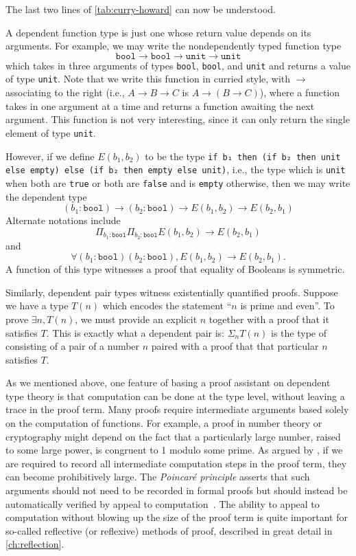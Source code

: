 The last two lines of \autoref{tab:curry-howard} can now be understood.

A dependent function type is just one whose return value depends on its arguments.
For example, we may write the nondependently typed function type
\[
\texttt{bool} \to \texttt{bool} \to \texttt{unit} \to \texttt{unit}
\]
which takes in three arguments of types \texttt{bool}, \texttt{bool}, and \texttt{unit} and returns a value of type \texttt{unit}.
Note that we write this function in curried style, with $\to$ associating to the right (i.e., $A \to B \to C$ is $A \to (B \to C)$), where a function takes in one argument at a time and returns a function awaiting the next argument.
This function is not very interesting, since it can only return the single element of type \texttt{unit}.

However, if we define $E(b_1, b_2)$ to be the type \texttt{if b₁ then (if b₂ then unit else empty) else (if b₂ then empty else unit)}, i.e., the type which is \texttt{unit} when both are \texttt{true} or both are \texttt{false} and is \texttt{empty} otherwise, then we may write the dependent type
\[
(b_1 : \texttt{bool}) \to (b_2 : \texttt{bool}) \to E(b_1, b_2) \to E(b_2, b_1)
\]
Alternate notations include
\[
\Pi_{b_1 : \texttt{bool}} \Pi_{b_2 : \texttt{bool}} E(b_1, b_2) \to E(b_2, b_1)
\]
and
\[
\forall (b_1 : \texttt{bool}) (b_2 : \texttt{bool}), E(b_1, b_2) \to E(b_2, b_1).
\]
A function of this type witnesses a proof that equality of Booleans is symmetric.

Similarly, dependent pair types witness existentially quantified proofs.
Suppose we have a type $T(n)$ which encodes the statement ``$n$ is prime and even''.
To prove $\exists n, T(n)$, we must provide an explicit $n$ together with a proof that it satisfies $T$.
This is exactly what a dependent pair is: $\Sigma_n T(n)$ is the type of consisting of a pair of a number $n$ paired with a proof that that particular $n$ satisfies $T$.


As we mentioned above, one feature of basing a proof assistant on dependent type theory is that computation can be done at the type level, without leaving a trace in the proof term.
Many proofs require intermediate arguments based solely on the computation of functions.
For example, a proof in number theory or cryptography might depend on the fact that a particularly large number, raised to some large power, is congruent to 1 modulo some prime.
As argued by \textcite{stampoulis2013veriml}, if we are required to record all intermediate computation steps in the proof term, they can become prohibitively large.
The \emph{Poincaré principle} asserts that such arguments should not need to be recorded in formal proofs but should instead be automatically verified by appeal to computation~\cite[p.~1167]{barendregt2001proof}.
The ability to appeal to computation without blowing up the size of the proof term is quite important for so-called reflective (or reflexive) methods of proof, described in great detail in \autoref{ch:reflection}.

